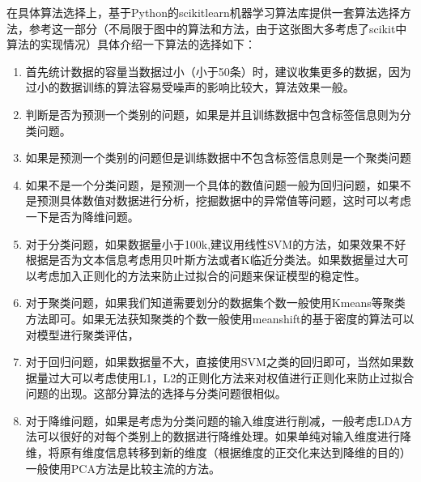 \documentclass[letterpaper,11pt,english]{sphinxmanual}
\begin{document}
在具体算法选择上，基于Python的scikit\sphinxhyphen{}learn机器学习算法库提供一套算法选择方法，参考这一部分（不局限于图中的算法和方法，由于这张图大多考虑了scikit中算法的实现情况）具体介绍一下算法的选择如下：
%
\begin{footnote}[833]\sphinxAtStartFootnote
{}
%
\end{footnote}
\begin{enumerate}
%
\item {} 
首先统计数据的容量当数据过小（小于50条）时，建议收集更多的数据，因为过小的数据训练的算法容易受噪声的影响比较大，算法效果一般。

\item {} 
判断是否为预测一个类别的问题，如果是并且训练数据中包含标签信息则为分类问题。

\item {} 
如果是预测一个类别的问题但是训练数据中不包含标签信息则是一个聚类问题

\item {} 
如果不是一个分类问题，是预测一个具体的数值问题一般为回归问题，如果不是预测具体数值对数据进行分析，挖掘数据中的异常值等问题，这时可以考虑一下是否为降维问题。

\item {} 
对于分类问题，如果数据量小于100k,建议用线性SVM的方法，如果效果不好根据是否为文本信息考虑用贝叶斯方法或者K临近分类法。如果数据量过大可以考虑加入正则化的方法来防止过拟合的问题来保证模型的稳定性。

\item {} 
对于聚类问题，如果我们知道需要划分的数据集个数一般使用Kmeans等聚类方法即可。如果无法获知聚类的个数一般使用mean\sphinxhyphen{}shift的基于密度的算法可以对模型进行聚类评估，

\item {} 
对于回归问题，如果数据量不大，直接使用SVM之类的回归即可，当然如果数据量过大可以考虑使用L1，L2的正则化方法来对权值进行正则化来防止过拟合问题的出现。这部分算法的选择与分类问题很相似。

\item {} 
对于降维问题，如果是考虑为分类问题的输入维度进行削减，一般考虑LDA方法可以很好的对每个类别上的数据进行降维处理。如果单纯对输入维度进行降维，将原有维度信息转移到新的维度（根据维度的正交化来达到降维的目的）一般使用PCA方法是比较主流的方法。

\end{enumerate}
\end{document}
